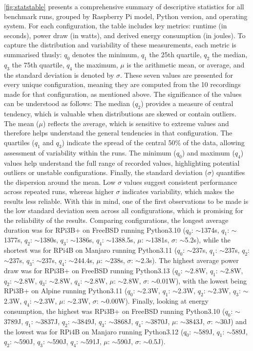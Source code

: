 \autoref{fig:statstable} presents a comprehensive summary of descriptive statistics for all benchmark runs, grouped by Raspberry Pi model, Python version, and operating system. For each configuration, the table includes key metrics: runtime (in seconds), power draw (in watts), and derived energy consumption (in joules). To capture the distribution and variability of these measurements, each metric is summarised thusly: $q_0$ denotes the minimum, $q_1$ the 25th quartile, $q_2$ the median, $q_3$ the 75th quartile, $q_4$ the maximum, $\mu$ is the arithmetic mean, or average, and the standard deviation is denoted by $\sigma$. These seven values are presented for every unique configuration, meaning they are computed from the 10 recordings made for that configuration, as mentioned above. The significance of the values can be understood as follows: The median ($q_2$) provides a measure of central tendency, which is valuable when distributions are skewed or contain outliers. The mean ($\mu$) reflects the average, which is sensitive to extreme values and therefore helps understand the general tendencies in that configuration. The quartiles ($q_1$ and $q_3$) indicate the spread of the central 50\% of the data, allowing assessment of variability within the runs. The minimum ($q_0$) and maximum ($q_4$) values help understand the full range of recorded values, highlighting potential outliers or unstable configurations. Finally, the standard deviation ($\sigma$) quantifies the dispersion around the mean. Low $\sigma$ values suggest consistent performance across repeated runs, whereas higher $\sigma$ indicates variability, which makes the results less reliable. With this in mind, one of the first observations to be made is the low standard deviation seen across all configurations, which is promising for the reliability of the results. Comparing configurations, the longest average duration was for RPi3B+ on FreeBSD running Python3.10 ($q_0$: $\sim$1374s, $q_1$: $\sim$1377s, $q_2$: $\sim$1380s, $q_3$: $\sim$1386s, $q_4$: $\sim$1388.5s, $\mu$: $\sim$1381s, $\sigma$: $\sim$5.2s), while the shortest was for RPi4B on Manjaro running Python3.11 ($q_0$: $\sim$237s, $q_1$: $\sim$237s, $q_2$: $\sim$237s, $q_3$: $\sim$237s, $q_4$: $\sim$244.4s, $\mu$: $\sim$238s, $\sigma$: $\sim$2.3s). The highest average power draw was for RPi3B+ on FreeBSD running Python3.13 ($q_0$: $\sim$2.8W, $q_1$: $\sim$2.8W, $q_2$: $\sim$2.8W, $q_3$: $\sim$2.8W, $q_4$: $\sim$2.8W, $\mu$: $\sim$2.8W, $\sigma$: $\sim$0.01W), with the lowest being RPi3B+ on Alpine running Python3.11 ($q_0$: $\sim$2.3W, $q_1$: $\sim$2.3W, $q_2$: $\sim$2.3W, $q_3$: $\sim$2.3W, $q_4$: $\sim$2.3W, $\mu$: $\sim$2.3W, $\sigma$: $\sim$0.00W).
Finally, looking at energy consumption, the highest was RPi3B+ on FreeBSD running Python3.10 ($q_0$: $\sim$3789J, $q_1$: $\sim$3837J, $q_2$: $\sim$3849J, $q_3$: $\sim$3868J, $q_4$: $\sim$3870J, $\mu$: $\sim$3843J, $\sigma$: $\sim$30J) and the lowest was for RPi4B on Manjaro running Python3.12
($q_0$: $\sim$589J, $q_1$: $\sim$589J, $q_2$: $\sim$590J, $q_3$: $\sim$590J, $q_4$: $\sim$591J, $\mu$: $\sim$590J, $\sigma$: $\sim$0.5J).  

